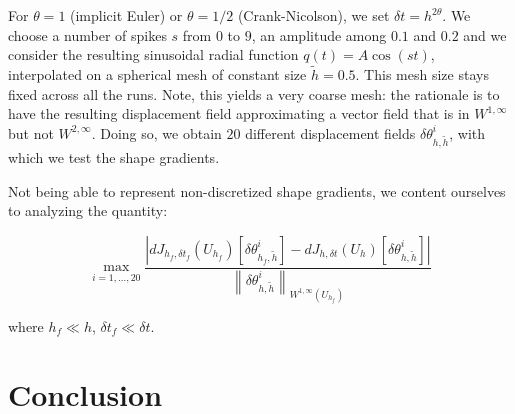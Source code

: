 \documentclass[english,a4paper,9pt,oneside]{scrbook}	%
\theoremstyle{break}
\theoremstyle{remark}
\newcommand{\norm}[1]{\left\lVert#1\right\rVert}
\newcommand{\te}{\theta}
\begin{document}
For $\theta=1$ (implicit Euler) or $\theta=1/2$ (Crank-Nicolson), we set $\delta t = h^{2\theta}$. We choose a number of spikes $s$ from $0$ to $9$, an amplitude among $0.1$ and $0.2$ and we consider the resulting sinusoidal radial function $q(t) = A \cos(st)$, interpolated on a spherical mesh of constant size $\tilde{h} = 0.5$. This mesh size stays fixed across all the runs. Note, this yields a very coarse mesh: the rationale is to have the resulting displacement field approximating a vector field that is in $W^{1,\infty}$ but not $W^{2,\infty}$. Doing so, we obtain $20$ different displacement fields $\delta \te_{h,\tilde{h}}^i$, with which we test the shape gradients.  


Not being able to represent non-discretized shape gradients, we content ourselves to analyzing the quantity:

$$\max_{i=1,...,20}\frac{|dJ_{h_f,\delta t_f}(U_{h_f})[\delta \te_{h_f,\tilde{h}}^i]-dJ_{h,\delta t}(U_h)[\delta \te_{h,\tilde{h}}^i]|}{\norm{\delta \te_{h,\tilde{h}}^i}_{W^{1,\infty}(U_{h_f})}}$$

where $h_f \ll h$, $\delta t_f \ll \delta t$.

\chapter{Conclusion}
\end{document}
